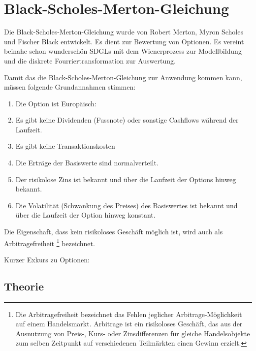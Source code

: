 %
%
%
%
\section{Black-Scholes-Merton-Gleichung\label{brown:BlackScholes}}

Die Black-Scholes-Merton-Gleichung wurde von Robert Merton, Myron Scholes und Fischer Black entwickelt. Es dient zur Bewertung von Optionen. Es vereint beinahe schon wunderschön SDGLs mit dem Wienerprozess zur Modellbildung und die diskrete Fourriertransformation zur Auswertung.

Damit das die Black-Scholes-Merton-Gleichung zur Anwendung kommen kann, müssen folgende Grundannahmen stimmen:
\begin{enumerate}
	\item Die Option ist Europäisch: 
	\item Es gibt keine Dividenden (Fussnote) oder sonstige Cashflows während der Laufzeit.
	\item Es gibt keine Transaktionskosten
	\item Die Erträge der Basiswerte sind normalverteilt.
	\item Der risikolose Zins ist bekannt und über die Laufzeit der Options hinweg bekannt.
	\item Die Volatilität (Schwankung des Preises) des Basiswertes ist bekannt und über die Laufzeit der Option hinweg konstant.
\end{enumerate}

Die Eigenschaft, dass kein risikoloses Geschäft möglich ist, wird auch als Arbitragefreiheit \footnote{Die Arbitragefreiheit bezeichnet das Fehlen jeglicher Arbitrage-Möglichkeit auf einem Handelsmarkt. Arbitrage ist ein risikoloses Geschäft, das aus der Ausnutzung von Preis-, Kurs- oder Zinsdifferenzen für gleiche Handelsobjekte zum selben Zeitpunkt auf verschiedenen Teilmärkten einen Gewinn erzielt.} bezeichnet.

Kurzer Exkurs zu Optionen:

\subsection{Theorie\label{brown:BlackScholes:theorie}}

